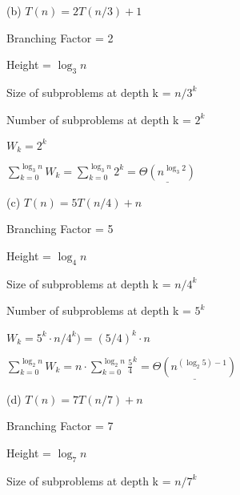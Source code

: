\documentclass{article} %
\begin{document}
    \vspace{5pt}

    (b) $T(n) = 2T(n / 3) + 1$

    \hspace{13pt} Branching Factor = 2
    
    \hspace{13pt} Height = $\log_3n $

    \hspace{13pt} Size of subproblems at depth k = $n / 3^k$
    
    \hspace{13pt} Number of subproblems at depth k = $2^k$

    \hspace{13pt} $W_k = 2^k$

    \hspace{13pt} $\sum^{\log_3 n}_{k = 0} W_k = \sum^{\log_3 n}_{k = 0} 2^k = \underline{\Theta(n^{\log_3 2})}$
    
    \vspace{5pt}

    (c) $T(n) = 5T(n / 4) + n$

    \hspace{13pt} Branching Factor = 5
    
    \hspace{13pt} Height = $\log_4n $

    \hspace{13pt} Size of subproblems at depth k = $n / 4^k$
    
    \hspace{13pt} Number of subproblems at depth k = $5^k$

    \hspace{13pt} $W_k = 5^k \cdot n/4^k) = (5/4)^k \cdot n$

    \hspace{13pt} $\sum^{\log_2 n}_{k = 0} W_k = n \cdot \sum^{\log_2 n}_{k = 0} \frac{5}{4}^k = \underline{\Theta(n^{(\log_2 5) - 1})}$

    \vspace{5pt} 

    (d) $T(n) = 7T(n / 7) + n$

    \hspace{13pt} Branching Factor = 7
    
    \hspace{13pt} Height = $\log_7n $

    \hspace{13pt} Size of subproblems at depth k = $n / 7^k$
    
\end{document}
